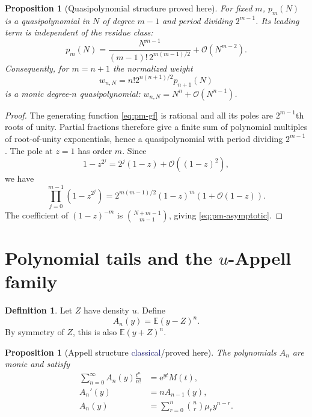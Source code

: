 \documentclass[11pt]{article}
\newtheorem{proposition}[theorem]{Proposition}
\theoremstyle{definition}
\newtheorem{definition}[theorem]{Definition}
\theoremstyle{remark}
\newcommand{\E}{\mathbb{E}}
\newcommand{\1}{\mathbf{1}}
\newcommand{\e}{\mathrm{e}}
\newcommand{\BigO}{\mathcal{O}}
\newcommand{\Classical}{\textcolor{MidnightBlue}{\textsf{classical}}}
\newcommand{\ProvedHere}{\textcolor{BrickRed}{\textsf{proved here}}}
\begin{document}
\begin{proposition}[Quasipolynomial structure \ProvedHere]
\label{prop:pm-quasi}
For fixed $m$, $p_m(N)$ is a quasipolynomial in $N$ of degree $m-1$ and period
dividing $2^{m-1}$.  Its leading term is independent of the residue class:
\begin{equation}
 p_m(N)=\frac{N^{m-1}}
 {(m-1)!\,2^{m(m-1)/2}}+\BigO(N^{m-2}).
 \label{eq:pm-asymptotic}
\end{equation}
Consequently, for $m=n+1$ the normalized weight
\begin{equation}
 w_{n,N}=n!2^{n(n+1)/2}p_{n+1}(N)
 \label{eq:normalized-weight}
\end{equation}
is a monic degree-$n$ quasipolynomial:
$w_{n,N}=N^n+\BigO(N^{n-1})$.
\end{proposition}

\begin{proof}
The generating function \eqref{eq:pm-gf} is rational and all its poles are
$2^{m-1}$th roots of unity.  Partial fractions therefore give a finite sum of
polynomial multiples of root-of-unity exponentials, hence a quasipolynomial
with period dividing $2^{m-1}$.  The pole at $z=1$ has order $m$.  Since
\[
 1-z^{2^j}=2^j(1-z)+\BigO((1-z)^2),
\]
we have
\[
 \prod_{j=0}^{m-1}(1-z^{2^j})
 =2^{m(m-1)/2}(1-z)^m(1+\BigO(1-z)).
\]
The coefficient of $(1-z)^{-m}$ is
$\binom{N+m-1}{m-1}$, giving \eqref{eq:pm-asymptotic}.
\end{proof}

\section{Polynomial tails and the $u$-Appell family}

\begin{definition}
Let $Z$ have density $u$.  Define
\begin{equation}
 A_n(y)=\E (y-Z)^n.
 \label{eq:An-def}
\end{equation}
By symmetry of $Z$, this is also $\E(y+Z)^n$.
\end{definition}

\begin{proposition}[Appell structure \Classical/\ProvedHere]
\label{prop:appell}
The polynomials $A_n$ are monic and satisfy
\begin{align}
 \sum_{n=0}^{\infty}A_n(y)\frac{t^n}{n!}
 &=\e^{yt}M(t),\label{eq:An-egf}\\
 A_n'(y)&=nA_{n-1}(y),\label{eq:An-appell}\\
 A_n(y)&=\sum_{r=0}^{n}\binom nr\mu_r y^{n-r}.
 \label{eq:An-moments}
\end{align}
\end{proposition}
\end{document}

